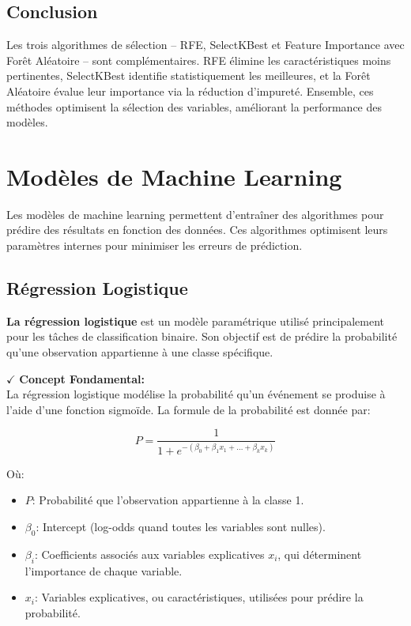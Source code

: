 \subsection{Conclusion}

Les trois algorithmes de sélection – RFE, SelectKBest et Feature Importance avec Forêt Aléatoire – sont complémentaires. RFE élimine les caractéristiques moins pertinentes, SelectKBest identifie statistiquement les meilleures, et la Forêt Aléatoire évalue leur importance via la réduction d'impureté. Ensemble, ces méthodes optimisent la sélection des variables, améliorant la performance des modèles.


\section{Modèles de Machine Learning}
Les modèles de machine learning permettent d’entraîner des algorithmes pour prédire des résultats en fonction des données. Ces algorithmes optimisent leurs paramètres internes pour minimiser les erreurs de prédiction.

\subsection{Régression Logistique}

\textbf{La régression logistique} est un modèle paramétrique utilisé principalement pour les tâches de classification binaire. Son objectif est de prédire la probabilité qu'une observation appartienne à une classe spécifique.

\textbf{\(\checkmark\)} \textbf{Concept Fondamental:}\\
La régression logistique modélise la probabilité qu’un événement se produise à l'aide d'une fonction sigmoïde. La formule de la probabilité est donnée par:

\[
P = \frac{1}{1 + e^{-(\beta_0 + \beta_1 x_1 + \dots + \beta_k x_k)}}
\]

Où:
\begin{itemize}
    \item \( P \): Probabilité que l'observation appartienne à la classe 1.
    \item \( \beta_0 \): Intercept (log-odds quand toutes les variables sont nulles).
    \item \( \beta_i \): Coefficients associés aux variables explicatives \( x_i \), qui déterminent l'importance de chaque variable.
    \item \( x_i \): Variables explicatives, ou caractéristiques, utilisées pour prédire la probabilité.
\end{itemize}

